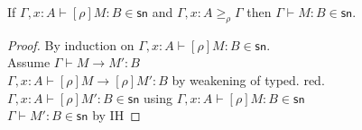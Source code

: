 \documentclass{article}
\newcommand{\ext}[1]{\geq_{#1}}
\newcommand{\csn}{\mathsf{sn}}
\newcommand{\red}{\longrightarrow}
\begin{document}
\begin{lemma}\label{lm:strsn}
If $\Gamma, x{:}A \vdash [\rho]M : B \in \csn$ and $\Gamma, x{:}A \ext{\rho} \Gamma$ then 
$\Gamma \vdash M : B \in \csn$.  
\end{lemma}
\begin{proof}
By induction on $\Gamma, x{:}A \vdash [\rho]M : B \in \csn$.
	\\[1em]
Assume $\Gamma \vdash M \red M' : B$ \\
$\Gamma, x{:}A \vdash [\rho]M \red [\rho]M' : B$ \hfill by weakening of typed. red. \\
$\Gamma, x{:}A \vdash [\rho]M' : B \in \csn$ \hfill using $\Gamma, x{:}A \vdash [\rho]M : B \in \csn$\\
$\Gamma \vdash M' : B \in \csn$ \hfill by IH

\end{proof}
\end{document}
